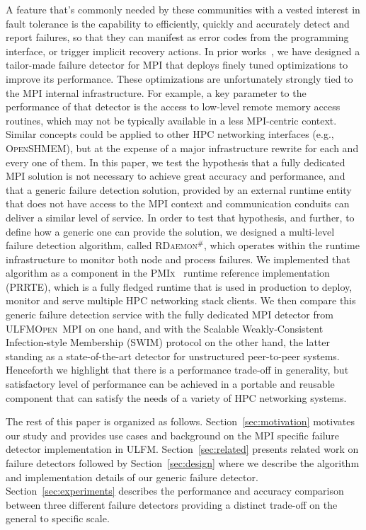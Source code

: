 \documentclass[sigconf]{acmart}
\newcommand{\prrte}[0]{\textsc{PRRTE}\xspace}
\newcommand{\pmix}[0]{\textsc{PMIx}\xspace}
\newcommand{\ompi}[0]{\textsc{Open~MPI}\xspace}
\newcommand{\ulfm}[0]{\textsc{ULFM}\xspace}
\newcommand{\mpi}[0]{\textsc{MPI}\xspace}
\newcommand{\oshmem}[0]{\textsc{OpenSHMEM}\xspace}
\newcommand{\ourwork}[0]{\textsc{RDaemon}\ensuremath{^\#}\xspace}
\begin{document}
A feature that's commonly needed by these communities with a vested
interest in fault tolerance is the capability to efficiently, quickly and
accurately detect and report failures, so that they can manifest as
error codes from the programming interface, or trigger implicit recovery
actions. In prior works~\cite{George16}, we have designed a tailor-made
failure detector for \mpi that deploys finely tuned optimizations to
improve its performance. These optimizations are unfortunately strongly
tied to the \mpi internal infrastructure. For example, a key parameter to
the performance of that detector is the
access to low-level remote memory access routines, which may not be typically
available in a less \mpi-centric context. Similar concepts could be
applied to other HPC networking interfaces (e.g., \oshmem), but at
the expense of a major infrastructure rewrite for each and every one of
them. In this paper, we test the hypothesis that a fully dedicated \mpi
solution is not necessary to achieve great accuracy and performance, and
that a generic failure detection solution, provided by an external runtime
entity that does not have access to the \mpi context and communication conduits
can deliver a similar level of service. In order to test that hypothesis,
and further, to define how a generic one can provide the solution, we designed
a multi-level failure detection algorithm, called \ourwork, which operates
within the runtime infrastructure to monitor both node and process
failures. We implemented that algorithm as a component in the \pmix~\cite{CASTAIN18} runtime reference implementation (\prrte), which is a fully fledged runtime that is
used in production to deploy, monitor and
serve multiple HPC networking stack clients.
We then compare this generic
failure detection service with the fully dedicated \mpi detector from
\ulfm \ompi on one hand, and with the Scalable Weakly-Consistent Infection-style Membership (SWIM) protocol on the other hand, the latter standing
as a state-of-the-art detector for unstructured peer-to-peer systems. Henceforth
we highlight that there is a performance trade-off in generality, but
satisfactory level of performance can be achieved in a portable and reusable
component that can satisfy the needs of a variety of HPC networking systems.

The rest of this paper is organized as follows. Section~\ref{sec:motivation}
motivates our study and provides use cases and background on the \mpi specific
failure detector implementation in \ulfm. Section~\ref{sec:related} presents
related work on failure detectors followed by Section~\ref{sec:design} where we
describe the algorithm and implementation details of our generic failure
detector. Section~\ref{sec:experiments} describes the performance and accuracy
comparison between three different failure detectors providing a distinct
trade-off on the general to specific scale.
\end{document}
